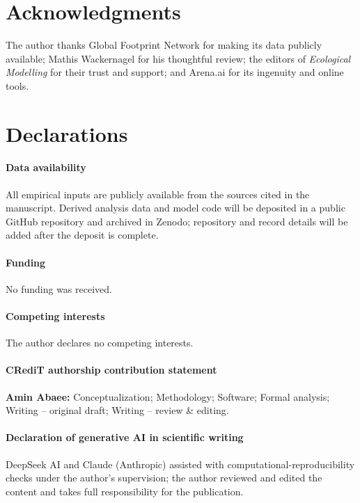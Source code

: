 \section*{Acknowledgments}

The author thanks Global Footprint Network for making its data publicly available; Mathis Wackernagel for his thoughtful review; the editors of \emph{Ecological Modelling} for their trust and support; and Arena.ai for its ingenuity and online tools.

\section*{Declarations}

\paragraph{Data availability} All empirical inputs are publicly available from the sources cited in the manuscript. Derived analysis data and model code will be deposited in a public GitHub repository and archived in Zenodo; repository and record details will be added after the deposit is complete.

\paragraph{Funding} No funding was received.

\paragraph{Competing interests} The author declares no competing interests.

\paragraph{CRediT authorship contribution statement} \textbf{Amin Abaee:} Conceptualization; Methodology; Software; Formal analysis; Writing -- original draft; Writing -- review \& editing.

\paragraph{Declaration of generative AI in scientific writing} DeepSeek AI and Claude (Anthropic) assisted with computational-reproducibility checks under the author's supervision; the author reviewed and edited the content and takes full responsibility for the publication.
